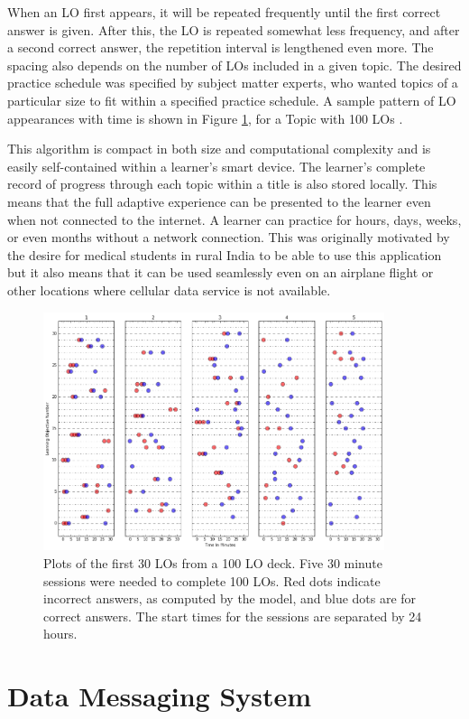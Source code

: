\documentclass[runningheads,a4paper]{llncs}
\begin{document}
When an LO first appears, it will be repeated frequently until the first correct answer is given.  After this, the LO is repeated somewhat less frequency, and after a second correct answer, the repetition interval is lengthened even more.  The spacing also depends on the number of LOs included in a given topic.  The desired practice schedule was specified by subject matter experts, who wanted topics of a particular size to fit within a specified practice schedule.  A sample pattern of LO appearances with time is shown in Figure \ref{fig:30_From_100LOs}, for a Topic with 100 LOs  \cite{Riedesel2017}.

This algorithm is compact in both size and computational complexity and is easily self-contained within a learner's smart device.  The learner's complete record of progress through each topic within a title is also stored locally.  This means that the full adaptive experience can be presented to the learner even when not connected to the internet.  A learner can practice for hours, days, weeks, or even months without a network connection.  This was originally motivated by the desire for medical students in rural India to be able to use this application but it also means that it can be used seamlessly even on an airplane flight or other locations where cellular data service is not available.

\begin{figure}
\centering
\includegraphics[height=2.75in]{30_From_100LOs}
\caption{Plots of the first 30 LOs from a 100 LO deck. Five 30 minute sessions were
needed to complete 100 LOs. Red dots indicate incorrect answers, as computed by
the model, and blue dots are for correct answers. The start times for the sessions are
separated by 24 hours.}
\label{fig:30_From_100LOs}
\end{figure}

\section{Data Messaging System}
\end{document}
